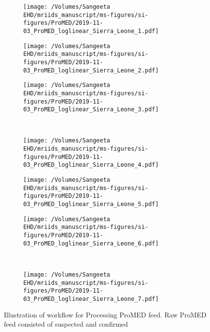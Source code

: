 \documentclass[9pt,twoside,lineno]{pnas-new}
\begin{document}
\begin{figure}
  \centering
\begin{subfigure}[b]{0.3\textwidth}
  \texttt{[image: /Volumes/Sangeeta
    EHD/mriids\_manuscript/ms-figures/si-figures/ProMED/2019-11-03\_ProMED\_loglinear\_Sierra\_Leone\_1.pdf]}
\end{subfigure} \hfill
\begin{subfigure}[b]{0.3\textwidth}
  \texttt{[image: /Volumes/Sangeeta
    EHD/mriids\_manuscript/ms-figures/si-figures/ProMED/2019-11-03\_ProMED\_loglinear\_Sierra\_Leone\_2.pdf]}
\end{subfigure} \hfill
\begin{subfigure}[b]{0.3\textwidth}
  \texttt{[image: /Volumes/Sangeeta
    EHD/mriids\_manuscript/ms-figures/si-figures/ProMED/2019-11-03\_ProMED\_loglinear\_Sierra\_Leone\_3.pdf]} 
\end{subfigure} \hfill
\\
\begin{subfigure}[b]{0.3\textwidth}
  \texttt{[image: /Volumes/Sangeeta
    EHD/mriids\_manuscript/ms-figures/si-figures/ProMED/2019-11-03\_ProMED\_loglinear\_Sierra\_Leone\_4.pdf]}
\end{subfigure} \hfill
\begin{subfigure}[b]{0.3\textwidth}
  \texttt{[image: /Volumes/Sangeeta
    EHD/mriids\_manuscript/ms-figures/si-figures/ProMED/2019-11-03\_ProMED\_loglinear\_Sierra\_Leone\_5.pdf]}
\end{subfigure} \hfill
\begin{subfigure}[b]{0.3\textwidth}
  \texttt{[image: /Volumes/Sangeeta
    EHD/mriids\_manuscript/ms-figures/si-figures/ProMED/2019-11-03\_ProMED\_loglinear\_Sierra\_Leone\_6.pdf]}
\end{subfigure} \hfill%
\\
\begin{subfigure}[t]{0.3\textwidth}
  \texttt{[image: /Volumes/Sangeeta
    EHD/mriids\_manuscript/ms-figures/si-figures/ProMED/2019-11-03\_ProMED\_loglinear\_Sierra\_Leone\_7.pdf]}
\end{subfigure} \hfill
\begin{subfigure}[t]{0.3\textwidth}
\end{subfigure} \hfill
\begin{subfigure}[t]{0.3\textwidth}
\end{subfigure} \hfill
  \caption{Illustration of workflow for Processing ProMED feed.
    Raw ProMED feed consisted of suspected and confirmed
}
\end{figure}
\end{document}

